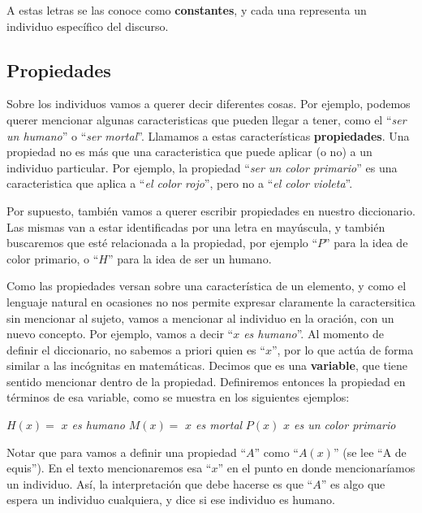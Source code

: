 A estas letras se las conoce como \textbf{constantes}, y cada una representa un individuo específico del discurso.

\subsection{Propiedades}
\label{chap:logica_predicados:subsec:propiedades}

Sobre los individuos vamos a querer decir diferentes cosas. Por ejemplo, podemos querer mencionar algunas caracteristicas que pueden llegar a tener, como el ``\textit{ser un humano}'' o ``\textit{ser mortal}''. Llamamos a estas características \textbf{propiedades}. Una propiedad no es más que una caracteristica que puede aplicar (o no) a un individuo particular. Por ejemplo, la propiedad ``\textit{ser un color primario}'' es una caracteristica que aplica a ``\textit{el color rojo}'', pero no a ``\textit{el color violeta}''.

Por supuesto, también vamos a querer escribir propiedades en nuestro diccionario. Las mismas van a estar identificadas por una letra en mayúscula, y también buscaremos que esté relacionada a la propiedad, por ejemplo ``\textit{$P$}'' para la idea de color primario, o ``\textit{$H$}'' para la idea de ser un humano.

Como las propiedades versan sobre una característica de un elemento, y como el lenguaje natural en ocasiones no nos permite expresar claramente la caractersitica sin mencionar al sujeto, vamos a mencionar al individuo en la oración, con un nuevo concepto. Por ejemplo, vamos a decir ``\textit{$x$ es humano}''. Al momento de definir el diccionario, no sabemos a priori quien es ``\textit{$x$}'', por lo que actúa de forma similar a las incógnitas en matemáticas. Decimos que es una \textbf{variable}, que tiene sentido mencionar dentro de la propiedad. Definiremos entonces la propiedad en términos de esa variable, como se muestra en los siguientes ejemplos:

\begin{example}
    \sindent $H(x) =$ \textit{$x$ es humano}
    \sindent $M(x) =$ \textit{$x$ es mortal}
    \sindent $P(x)$ \textit{$x$ es un color primario}
\end{example}

Notar que para vamos a definir una propiedad ``$A$'' como ``$A(x)$'' (se lee ``A de equis''). En el texto mencionaremos esa ``$x$'' en el punto en donde mencionaríamos un individuo. Así, la interpretación que debe hacerse es que ``$A$'' es algo que espera un individuo cualquiera, y dice si ese individuo es humano.

